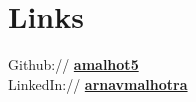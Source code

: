 \documentclass[a4paper]{deedy-resume-openfont} %
\begin{document}
\begin{minipage}[t]{0.33\textwidth}



\section{Links} 

Github:// \href{https://github.com/amalhot5}{\bf amalhot5} \\
LinkedIn:// \href{https://www.linkedin.com/in/arnavmalhotra}{\bf arnavmalhotra} 
\sectionsep


\end{minipage} %
\hfill
%
%
\end{document}
